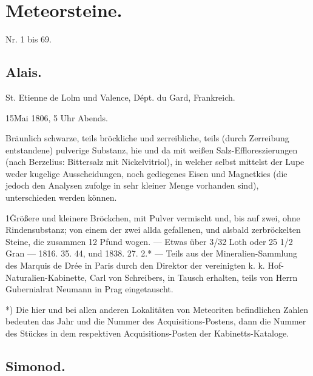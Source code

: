 \documentclass[a4paper, 11pt, oneside, polutonikogreek, german]{article}
\begin{document}
\section{Meteorsteine.}
\begin{center}
Nr. 1 bis 69.
\end{center}
\subsection{Alais.}

St. Etienne de Lolm und Valence, Dépt. du Gard, Frankreich.

15\. Mai 1806, 5 Uhr Abends.

Bräunlich schwarze, teils bröckliche und zerreibliche, teils (durch Zerreibung entstandene) pulverige Substanz, hie und da mit weißen Salz-Effloreszierungen (nach Berzelius: Bittersalz mit Nickelvitriol), in welcher selbst mittelst der Lupe weder kugelige Ausscheidungen, noch gediegenes Eisen und Magnetkies (die jedoch den Analysen zufolge in sehr kleiner Menge vorhanden sind), unterschieden werden können.

1\. Größere und kleinere Bröckchen, mit Pulver vermischt und, bis auf zwei, ohne Rindensubstanz; von einem der zwei allda gefallenen, und alsbald zerbröckelten Steine, die zusammen 12 Pfund wogen. — Etwas über 3/32 Loth oder 25 1/2 Gran — 1816. 35. 44, und 1838. 27. 2.* — Teils aus der Mineralien-Sammlung des Marquis de Drée in Paris durch den Direktor der vereinigten k. k. Hof-Naturalien-Kabinette, Carl von Schreibers, in Tausch erhalten, teils von Herrn Gubernialrat Neumann in Prag eingetauscht.

*) Die hier und bei allen anderen Lokalitäten von Meteoriten befindlichen Zahlen bedeuten das Jahr und die Nummer des Acquisitions-Postens, dann die Nummer des Stückes in dem respektiven Acquisitions-Posten der Kabinetts-Kataloge.

\subsection{Simonod.}

\clearpage
\end{document}
